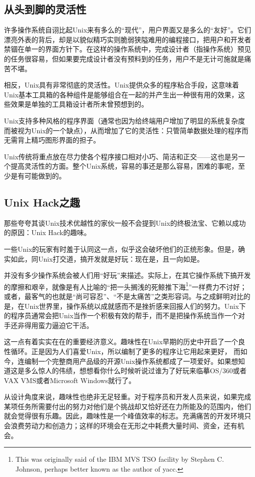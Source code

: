 \documentclass[12pt,oneside]{book}
\begin{document}
\subsection{从头到脚的灵活性}
许多操作系统自诩比起Unix来有多么的“现代”，用户界面又是多么的“友好”。它们漂亮外表的背后，却是以貌似精巧实则脆弱狭隘难用的编程接口，把用户和开发者禁锢在单一的界面方针下。在这样的操作系统中，完成设计者（指操作系统）预见的任务很容易，但如果要完成设计者没有预料到的任务，用户不是无计可施就是痛苦不堪。

相反，Unix具有非常彻底的灵活性。Unix提供众多的程序粘合手段，这意味着Unix基本工具箱的各种组件是能够组合在一起的并产生出一种很有用的效果，这些效果是单独的工具箱设计者所未曾预想到的。

Unix支持多种风格的程序界面（通常也因为给终端用户增加了明显的系统复杂度而被视为Unix的一个缺点），从而增加了它的灵活性：只管简单数据处理的程序而无需背上精巧图形界面的担子。

Unix传统将重点放在尽力使各个程序接口相对小巧、简洁和正交——这也是另一个提高灵活性的方面。整个Unix系统，容易的事还是那么容易，困难的事呢，至少是有可能做到的。

\subsection{Unix Hack之趣}
那些夸夸其谈Unix技术优越性的家伙一般不会提到Unix的终极法宝、它赖以成功的原因：Unix Hack的趣味。

一些Unix的玩家有时羞于认同这一点，似乎这会破坏他们的正统形象。但是，确实如此，同Unix打交道，搞开发就是好玩：现在是，且一向如是。

并没有多少操作系统会被人们用“好玩”来描述。实际上，在其它操作系统下搞开发的摩擦和艰辛，就像是有人比喻的“把一头搁浅的死鲸推下海\footnote{This was originally said of the IBM MVS TSO facility by Stephen C. Johnson, perhaps better known as the author of yacc.}”一样费力不讨好；或者，最客气的也就是“尚可容忍”、“不是太痛苦”之类形容词。与之成鲜明对比的是，在Unix世界里，操作系统以成就感而不是挫折感来回报人们的努力。Unix下的程序员通常会把Unix当作一个积极有效的帮手，而不是把操作系统当作一个对手还非得用蛮力逼迫它干活。

这一点有着实实在在的重要经济意义。趣味性在Unix早期的历史中开启了一个良性循环。正是因为人们喜爱Unix，所以编制了更多的程序让它用起来更好，  而如今，连编制一个完整商用产品级的开源Unix操作系统都成了一项爱好。如果想知道这是多么惊人的伟绩，想想看你什么时候听说过谁为了好玩来临摹OS/360或者VAX VMS或者Microsoft Windows就行了。

从设计角度来说，趣味性也绝非无足轻重。对于程序员和开发人员来说，如果完成某项任务所需要付出的努力对他们是个挑战却又恰好还在力所能及的范围内，他们就会觉得很有乐趣。因此，趣味性是一个峰值效率的标志。充满痛苦的开发环境只会浪费劳动力和创造力；这样的环境会在无形之中耗费大量时间、资金，还有机会。
\end{document}
